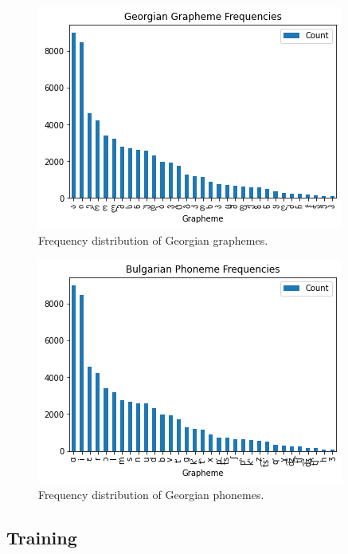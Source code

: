 \documentclass[11pt,a4paper]{article}
\begin{document}
\begin{figure}[ht]
    \centering
    \includegraphics[width=\linewidth]{geo_graphemes.png}
    \caption{Frequency distribution of Georgian graphemes.}
    \label{fig:geo_graphemes}
\end{figure}

\begin{figure}[ht]
    \centering
    \includegraphics[width=\linewidth]{geo_phonemes.png}
    \caption{Frequency distribution of Georgian phonemes.}
    \label{fig:geo_phonemes}
\end{figure}

\subsection{Training}
\end{document}
